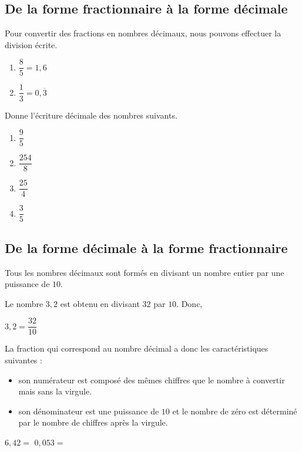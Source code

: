 \documentclass[../../syllabus_2.tex]{subfiles}
\begin{document}
\newpage
\subsection{De la forme fractionnaire à la forme décimale}
Pour convertir des fractions en nombres décimaux, nous pouvons effectuer la division écrite.
\exemples
\begin{enumerate}[cols=2]
  \item $\dfrac{8}{5}=1,6$
        \medbreak
        \columnbreak

  \item $\dfrac{1}{3}=0,\overline{3}$\medbreak{}
\end{enumerate}

\begin{exercise}
  Donne l'écriture décimale des nombres suivants.
  \begin{enumerate}[cols=2, itemsep=7cm]
    \item $\dfrac{9}{5}$
    \item $\dfrac{254}{8}$
    \item $\dfrac{25}{4}$
    \item $\dfrac{3}{5}$
  \end{enumerate}
\end{exercise}

\newpage
\subsection{De la forme décimale à la forme fractionnaire}
Tous les nombres décimaux sont formés en divisant un nombre entier par une puissance de $10$.

\exemple
Le nombre $3,2$ est obtenu en divisant $32$ par $10$. Donc, 

\begin{center}
  \(3,2 = \dfrac{32}{10}\)
\end{center}


La fraction qui correspond au nombre décimal a donc les caractéristiques suivantes :

\begin{itemize}[label=,itemsep=1em]
  \item son numérateur est composé des mêmes chiffres que le nombre à convertir mais sans la virgule.
  \item son dénominateur est une puissance de $10$ et le nombre de zéro est déterminé par le nombre de chiffres après la virgule.
\end{itemize}
\vspace{1em}
\exemples $6,42 = $ \hfill $0,053 = $
\end{document}
